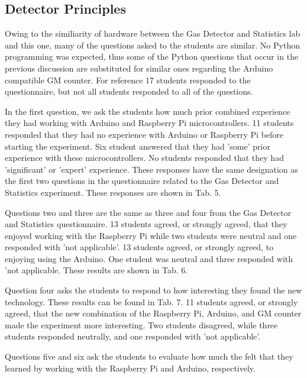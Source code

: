 \subsection{Detector Principles}
Owing to the similiarity of hardware between the Gas Detector and Statistics lab and this one, many of the questions asked to the students are similar.
No Python programming was expected, thus some of the Python questions that occur in the previous discussion are substituted for similar ones regarding the Arduino compatible GM counter.
For reference 17 students responded to the questionnaire, but not all students responded to all of the questions.

In the first question, we ask the students how much prior combined experience they had working with Arduino and Raspberry Pi microcontrollers.
11 students responded that they had no experience with Arduino or Raspberry Pi before starting the experiment.
Six student answered that they had 'some' prior experience with these microcontrollers.
No students responded that they had 'significant' or 'expert' experience.
These responses have the same designation as the first two questions in the questionnaire related to the Gas Detector and Statistics experiment.
These responses are shown in Tab. 5.

Questions two and three are the same as three and four from the Gas Detector and Statistics questionnaire.
13 students agreed, or strongly agreed, that they enjoyed working with the Raspberry Pi while two students were neutral and one responded with 'not applicable'.
13 students agreed, or strongly agreed, to enjoying using the Arduino.
One student was neutral and three responded with 'not applicable.
These results are shown in Tab. 6.

Question four asks the students to respond to how interesting they found the new technology.
These results can be found in Tab. 7.
11 students agreed, or strongly agreed, that the new combination of the Raspberry Pi, Arduino, and GM counter made the experiment more interesting.
Two students disagreed, while three students responded neutrally, and one responded with 'not applicable'.

Questions five and six ask the students to evaluate how much the felt that they learned by working with the Raspberry Pi and Arduino, respectively.
